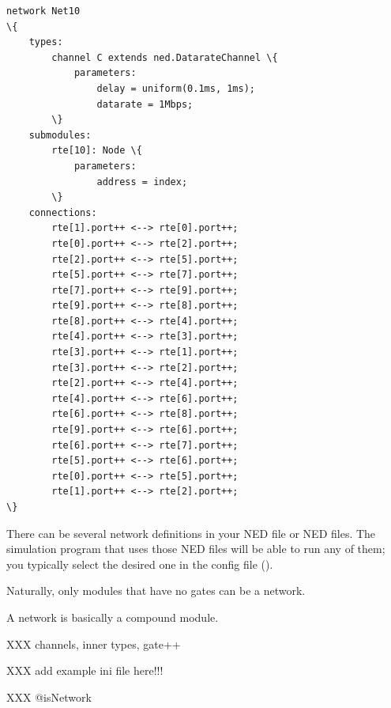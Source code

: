 \begin{Verbatim}[commandchars=\\\{\}]
network Net10
\{
    types:
        channel C extends ned.DatarateChannel \{
            parameters:
                delay = uniform(0.1ms, 1ms);
                datarate = 1Mbps;
        \}
    submodules:
        rte[10]: Node \{
            parameters:
                address = index;
        \}
    connections:
        rte[1].port++ <--> rte[0].port++;
        rte[0].port++ <--> rte[2].port++;
        rte[2].port++ <--> rte[5].port++;
        rte[5].port++ <--> rte[7].port++;
        rte[7].port++ <--> rte[9].port++;
        rte[9].port++ <--> rte[8].port++;
        rte[8].port++ <--> rte[4].port++;
        rte[4].port++ <--> rte[3].port++;
        rte[3].port++ <--> rte[1].port++;
        rte[3].port++ <--> rte[2].port++;
        rte[2].port++ <--> rte[4].port++;
        rte[4].port++ <--> rte[6].port++;
        rte[6].port++ <--> rte[8].port++;
        rte[9].port++ <--> rte[6].port++;
        rte[6].port++ <--> rte[7].port++;
        rte[5].port++ <--> rte[6].port++;
        rte[0].port++ <--> rte[5].port++;
        rte[1].port++ <--> rte[2].port++;
\}
\end{Verbatim}

There can be several network definitions in your NED file or NED files.
The simulation program that uses those NED files will be
able to run any of them; you typically select the desired one
in the config file ().

Naturally, only modules that have no gates can be a network.

A network is basically a compound module.

XXX channels, inner types, gate++

XXX add example ini file here!!!

XXX @isNetwork





